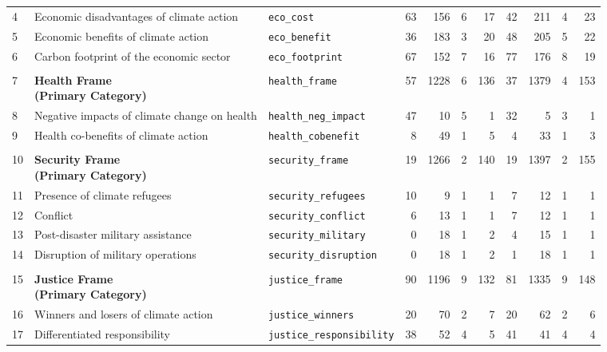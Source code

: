 \begin{longtable}{p{0.5cm}p{4.0cm}p{3.0cm}rrrrrrrr}
4 & Economic disadvantages of climate action & \texttt{eco\_cost} & 63 & 156 & 6 & 17 & 42 & 211 & 4 & 23 \\
5 & Economic benefits of climate action & \texttt{eco\_benefit} & 36 & 183 & 3 & 20 & 48 & 205 & 5 & 22 \\
6 & Carbon footprint of the economic sector & \texttt{eco\_footprint} & 67 & 152 & 7 & 16 & 77 & 176 & 8 & 19 \\
\midrule
\rowcolor{gray!8}
\multicolumn{11}{l}{\textit{Health Frame}} \\
\midrule
7 & \textbf{Health Frame\newline (Primary Category)} & \texttt{health\_frame} & 57 & 1228 & 6 & 136 & 37 & 1379 & 4 & 153 \\
\cmidrule(lr){1-11}
8 & Negative impacts of climate change on health & \texttt{health\_neg\_impact} & 47 & 10 & 5 & 1 & 32 & 5 & 3 & 1 \\
9 & Health co-benefits of climate action & \texttt{health\_cobenefit} & 8 & 49 & 1 & 5 & 4 & 33 & 1 & 3 \\
\midrule
\rowcolor{gray!8}
\multicolumn{11}{l}{\textit{Security Frame}} \\
\midrule
10 & \textbf{Security Frame\newline (Primary Category)} & \texttt{security\_frame} & 19 & 1266 & 2 & 140 & 19 & 1397 & 2 & 155 \\
\cmidrule(lr){1-11}
11 & Presence of climate refugees & \texttt{security\_refugees} & 10 & 9 & 1 & 1 & 7 & 12 & 1 & 1 \\
12 & Conflict & \texttt{security\_conflict} & 6 & 13 & 1 & 1 & 7 & 12 & 1 & 1 \\
13 & Post-disaster military assistance & \texttt{security\_military} & 0 & 18 & 1 & 2 & 4 & 15 & 1 & 1 \\
14 & Disruption of military operations & \texttt{security\_disruption} & 0 & 18 & 1 & 2 & 1 & 18 & 1 & 1 \\
\midrule
\rowcolor{gray!8}
\multicolumn{11}{l}{\textit{Justice Frame}} \\
\midrule
15 & \textbf{Justice Frame\newline (Primary Category)} & \texttt{justice\_frame} & 90 & 1196 & 9 & 132 & 81 & 1335 & 9 & 148 \\
\cmidrule(lr){1-11}
16 & Winners and losers of climate action & \texttt{justice\_winners} & 20 & 70 & 2 & 7 & 20 & 62 & 2 & 6 \\
17 & Differentiated responsibility & \texttt{justice\_responsibility} & 38 & 52 & 4 & 5 & 41 & 41 & 4 & 4 \\

\end{longtable}
